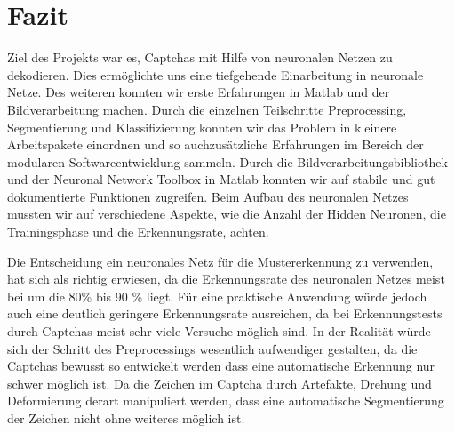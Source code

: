 \section{Fazit}
Ziel des Projekts war es, Captchas mit Hilfe von neuronalen Netzen zu dekodieren. Dies ermöglichte uns eine tiefgehende Einarbeitung in neuronale Netze. Des weiteren konnten wir erste Erfahrungen in Matlab und der Bildverarbeitung machen. Durch die einzelnen Teilschritte Preprocessing, Segmentierung und Klassifizierung konnten wir das Problem in kleinere Arbeitspakete einordnen und so auchzusätzliche Erfahrungen im Bereich der modularen Softwareentwicklung sammeln. Durch die Bildverarbeitungsbibliothek und der Neuronal Network Toolbox in Matlab konnten wir auf stabile und gut dokumentierte Funktionen zugreifen. Beim Aufbau des neuronalen Netzes mussten wir auf verschiedene Aspekte, wie die Anzahl der Hidden Neuronen, die Trainingsphase und die Erkennungsrate, achten. 
 
Die Entscheidung ein neuronales Netz für die Mustererkennung zu verwenden, hat sich als richtig erwiesen, da die Erkennungsrate des neuronalen Netzes meist bei um die 80\% bis 90 \% liegt. Für eine praktische Anwendung würde jedoch auch eine deutlich geringere Erkennungsrate ausreichen, da bei Erkennungstests durch Captchas meist sehr viele Versuche möglich sind. In der Realität würde sich der Schritt des Preprocessings wesentlich aufwendiger gestalten, da die Captchas bewusst so entwickelt werden dass eine automatische Erkennung nur schwer möglich ist. Da die Zeichen im Captcha durch Artefakte, Drehung und Deformierung derart manipuliert werden, dass eine automatische Segmentierung der Zeichen nicht ohne weiteres möglich ist.
